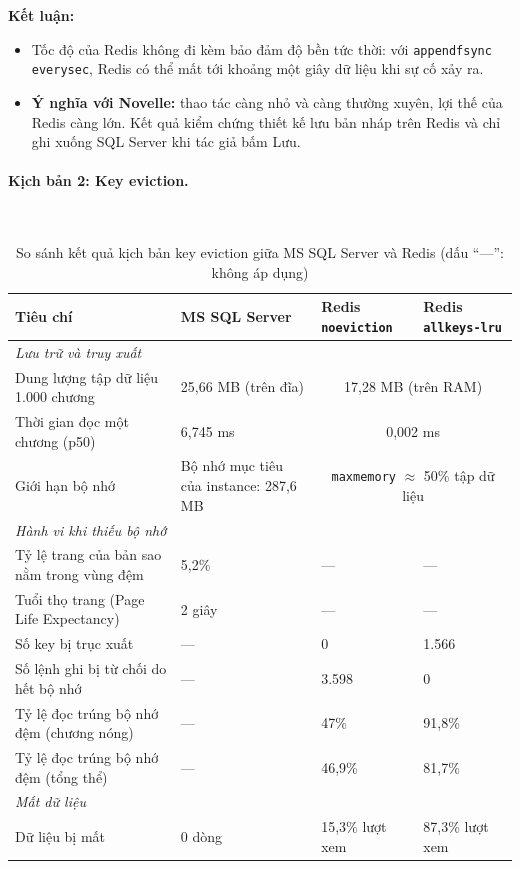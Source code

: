 \textbf{Kết luận:}
\begin{itemize}
    \item Tốc độ của Redis không đi kèm bảo đảm độ bền tức thời: với \texttt{appendfsync everysec}, Redis có thể mất tới khoảng một giây dữ liệu khi sự cố xảy ra.
    \item \textbf{Ý nghĩa với Novelle:} thao tác càng nhỏ và càng thường xuyên, lợi thế của Redis càng lớn. Kết quả kiểm chứng thiết kế lưu bản nháp trên Redis và chỉ ghi xuống SQL Server khi tác giả bấm Lưu.
\end{itemize}

\paragraph{Kịch bản 2: Key eviction.}\mbox{}\\
\begin{table}[H]
\centering
\small
\renewcommand{\arraystretch}{1.25}
\begin{tabular}{|p{}|p{}|p{}|p{}|}
\hline
\textbf{Tiêu chí} & \textbf{MS SQL Server} & \textbf{Redis} \texttt{noeviction} & \textbf{Redis} \texttt{allkeys-lru} \\ \hline
\multicolumn{4}{|l|}{\textit{Lưu trữ và truy xuất}} \\ \hline
Dung lượng tập dữ liệu 1.000 chương & 25,66 MB (trên đĩa) & \multicolumn{2}{c|}{17,28 MB (trên RAM)} \\ \hline
Thời gian đọc một chương (p50) & 6,745 ms & \multicolumn{2}{c|}{0,002 ms} \\ \hline
Giới hạn bộ nhớ & Bộ nhớ mục tiêu của instance: 287,6 MB & \multicolumn{2}{c|}{\texttt{maxmemory} $\approx$ 50\% tập dữ liệu} \\ \hline
\multicolumn{4}{|l|}{\textit{Hành vi khi thiếu bộ nhớ}} \\ \hline
Tỷ lệ trang của bản sao nằm trong vùng đệm & 5,2\% & --- & --- \\ \hline
Tuổi thọ trang (Page Life Expectancy) & 2 giây & --- & --- \\ \hline
Số key bị trục xuất & --- & 0 & 1.566 \\ \hline
Số lệnh ghi bị từ chối do hết bộ nhớ & --- & 3.598 & 0 \\ \hline
Tỷ lệ đọc trúng bộ nhớ đệm (chương nóng) & --- & 47\% & 91,8\% \\ \hline
Tỷ lệ đọc trúng bộ nhớ đệm (tổng thể) & --- & 46,9\% & 81,7\% \\ \hline
\multicolumn{4}{|l|}{\textit{Mất dữ liệu}} \\ \hline
Dữ liệu bị mất & 0 dòng & 15,3\% lượt xem & 87,3\% lượt xem \\ \hline
\end{tabular}
\caption{So sánh kết quả kịch bản key eviction giữa MS SQL Server và Redis (dấu ``---'': không áp dụng)}
\label{tab:ds-eviction-results}
\end{table}

